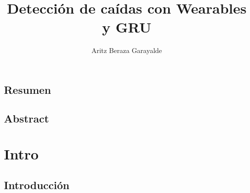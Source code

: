 \documentclass[11pt,a4paper,spanish]{book}
\title{Detección de caídas con Wearables y GRU}
\author{Aritz Beraza Garayalde}
\date{\currenttime}
\begin{document}



\renewcommand{\listfigurename}{Índice de Ilustraciones}
\renewcommand{\listtablename}{Índice de Tablas}
\renewcommand{\contentsname}{Índice de Contenidos}
\renewcommand{\figurename}{Figura}
\renewcommand{\tablename}{Tabla}

\maketitle
\frontmatter
\tableofcontents
\listoffigures
\listoftables

\mainmatter

\section*{Resumen}


\section*{Abstract}



\chapter{Intro}\label{chap:intro}
\section{Introducción}

\end{document}
